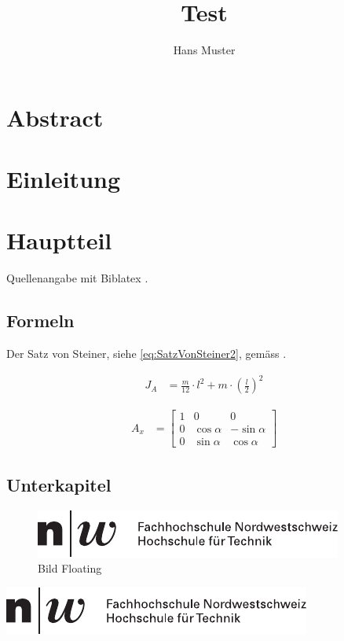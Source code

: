 \documentclass{profhnw}
\author{Hans Muster}
\title{Test}
\begin{document}
\maketitle %

\section*{Abstract}
\lipsum[1] %

\tableofcontents

\section{Einleitung}
\lipsum[2-3] %

\section{Hauptteil}
\lipsum[5] 
Quellenangabe mit Biblatex \parencites[S. 203]{Rowling:HarryPotter}.

\subsection{Formeln}

Der Satz von Steiner, siehe \cref{eq:SatzVonSteiner2}, gemäss \citeauthor{Papula:Band1} \parencite{Papula:Band1}.

\begin{align}
\label{eq:SatzVonSteiner2}
J_A &= \frac{m}{12}\cdot l^{2} + m\cdot \left(\frac{l}{2}\right)^{2}
\end{align}

\begin{align}
\label{eq:ROT_X}
A_{x} &= \begin{bmatrix} 
1 & 0 & 0\\ 
0 & \cos{\alpha} & -\sin{\alpha}\\		
0 & \sin{\alpha} & \cos{\alpha} 
\end{bmatrix}
\end{align}

\subsection{Unterkapitel}
\lipsum[4]

\begin{figure}
	\centering
	\includegraphics[width=0.8\linewidth]{FHNW_HT}
	\caption{Bild Floating}
\end{figure}

\begin{center}
	\includegraphics[width=0.6\linewidth]{FHNW_HT}
\end{center}

\printbibliography
\end{document}
